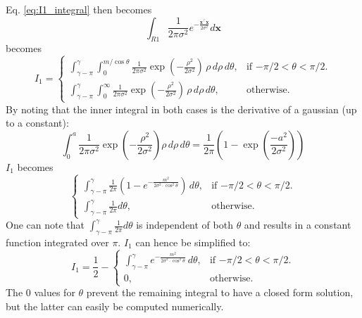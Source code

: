 Eq. \eqref{eq:I1_integral} then becomes
\begin{equation}
\int_{R1} \frac{1}{2\pi \sigma^2} e^{-\frac{\mathbf{x}^\intercal \mathbf{x}}{2 \sigma^2}} d\mathbf{x}
\end{equation}
becomes 
\begin{equation}
I_1=\begin{cases}
    \int_{\gamma - \pi}^{\gamma}\int_0^{m/\cos \theta}{\frac{1}{2\pi \sigma^2} \exp{\left(-\frac{\rho^2}{2 \sigma^2}\right)}\, \rho \,d\rho \,d\theta}, & \text{if $-\pi/2<\theta<\pi/2$}.\\
    \int_{\gamma - \pi}^{\gamma}\int_0^{\infty}{\frac{1}{2\pi \sigma^2} \exp{\left(-\frac{\rho^2}{2 \sigma^2}\right)}\,\rho \,d\rho \,d\theta}, & \text{otherwise}.
  \end{cases}
\end{equation}
By noting that the inner integral in both cases is the derivative of a gaussian (up to a constant):
\begin{equation}
\int_0^{a}{\frac{1}{2\pi \sigma^2} \exp{(-\frac{\rho^2}{2 \sigma^2})}\rho \,d\rho \,d\theta} =\frac{1}{2\pi} \left(1 - \exp{\left(\frac{-a^2}{2\sigma^2}\right)}\right)
\end{equation}
$I_1$ becomes
\begin{equation}
\begin{cases}
    \int_{\gamma - \pi}^{\gamma}{\frac{1}{2\pi} \left(1 - e^{-\frac{m^2}{2 \sigma^2 \cdot \cos^2{\theta}}}\right)\,d\theta}, & \text{if $-\pi/2<\theta<\pi/2$}.\\
    \int_{\gamma - \pi}^{\gamma}{\frac{1}{2\pi}d\theta}, & \text{otherwise}.
  \end{cases}
\end{equation}
One can note that $\int_{\gamma - \pi}^{\gamma}{\frac{1}{2\pi}d\theta}$ is independent of both $\theta$ and results in a constant function integrated over $\pi$. $I_1$ can hence be simplified to:
\begin{equation} \label{eq:final_frequency_I_integral}
    I_1 = \frac{1}{2} - 
    \begin{cases}
    \int_{\gamma - \pi}^{\gamma}{e^{-\frac{m^2}{2 \sigma^2 \cdot \cos^2{\theta}}}\,d\theta}, & \text{if $-\pi/2<\theta<\pi/2$}.\\
    0, & \text{otherwise}.
  \end{cases}
\end{equation}
The 0 values for $\theta$ prevent the remaining integral to have a closed form solution, but the latter can easily be computed numerically. 

